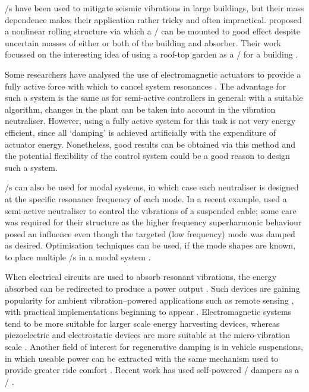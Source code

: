 \documentclass[11pt,a4paper]{memoir}
\begin{document}
\Vibneut/s have been used to mitigate seismic vibrations in large buildings, but their mass dependence makes their application rather tricky and often impractical.
\textcite{matta2008} proposed a nonlinear rolling structure via which a \vibneut/ can be mounted to good effect despite uncertain masses of either or both of the building and absorber.
Their work focussed on the interesting idea of using a roof-top garden as a \vibneut/ for a building \cite{matta2008a}.

Some researchers have analysed the use of electromagnetic actuators to provide a fully active force with which to cancel system resonances \cite{chen2005a,wu2007,kim2008-iecst}.
The advantage for such a system is the same as for semi-active controllers in general: with a suitable algorithm, changes in the plant can be taken into account in the vibration neutraliser.
However, using a fully active system for this task is not very energy efficient, since all `damping' is achieved artificially with the expenditure of actuator energy.
Nonetheless, good results can be obtained via this method and the potential flexibility of the control system could be a good reason to design such a system.

\Vibneut/s can also be used for modal systems, in which case each neutraliser is designed at the specific resonance frequency of each mode.
In a recent example, \textcite{casciati2007} used a semi-active neutraliser to control the vibrations of a suspended cable; some care was required for their structure as the higher frequency superharmonic behaviour posed an influence even though the targeted (low frequency) mode was damped as desired.
Optimisation techniques can be used, if the mode shapes are known, to place multiple \vibneut/s in a modal system \cite{petit2009-jva}.

When electrical circuits are used to absorb resonant vibrations, the energy absorbed can be redirected to produce a power output \cite{stephen2006}.
Such devices are gaining popularity for ambient vibration--powered applications such as remote sensing \cite{arnold2007}, with practical implementations beginning to appear \cite{ferrari2009-sms}.
Electromagnetic systems tend to be more suitable for larger scale energy harvesting devices, whereas piezoelectric and electrostatic devices are more suitable at the micro-vibration scale \cite{beeby2009}.
Another field of interest for regenerative damping is in vehicle suspensions, in which useable power can be extracted with the same mechanism used to provide greater ride comfort \cite{graves2000thesis}.
Recent work has used self-powered \magnetorh/ dampers as a \vibneut/ \cite{choi2009-jva}.
\end{document}
